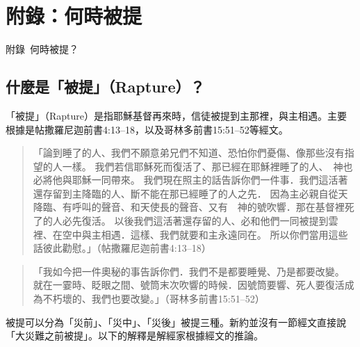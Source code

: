 


\renewcommand{\appendixname}{附錄}
\renewcommand{\thechapter}{\arabic{chapter}}
\renewcommand{\thefigure}{\appendixname~\thechapter.\arabic{figure}}  %

\chapter*{附錄：何時被提}
%
  {\appendixname~\thechapter\quad 何時被提？}



\section*{什麼是「被提」（Rapture）？}


「被提」（Rapture）是指耶穌基督再來時，信徒被提到主那裡，與主相遇。主要根據是帖撒羅尼迦前書4:13–18，以及哥林多前書15:51–52等經文。

\begin{quote}

「論到睡了的人、我們不願意弟兄們不知道、恐怕你們憂傷、像那些沒有指望的人一樣。
我們若信耶穌死而復活了、那已經在耶穌裡睡了的人、　神也必將他與耶穌一同帶來。
我們現在照主的話告訴你們一件事．我們這活著還存留到主降臨的人、斷不能在那已經睡了的人之先．
因為主必親自從天降臨、有呼叫的聲音、和天使長的聲音、又有　神的號吹響．那在基督裡死了的人必先復活。
以後我們這活著還存留的人、必和他們一同被提到雲裡、在空中與主相遇．這樣、我們就要和主永遠同在。
所以你們當用這些話彼此勸慰。」（帖撒羅尼迦前書4:13–18）
\end{quote}

\begin{quote}
「我如今把一件奧秘的事告訴你們．我們不是都要睡覺、乃是都要改變。
就在一霎時、眨眼之間、號筒末次吹響的時候．因號筒要響、死人要復活成為不朽壞的、我們也要改變。」（哥林多前書15:51–52）
\end{quote}

被提可以分為「災前」、「災中」、「災後」被提三種。新約並沒有一節經文直接說「大災難之前被提」。以下的解釋是解經家根據經文的推論。

